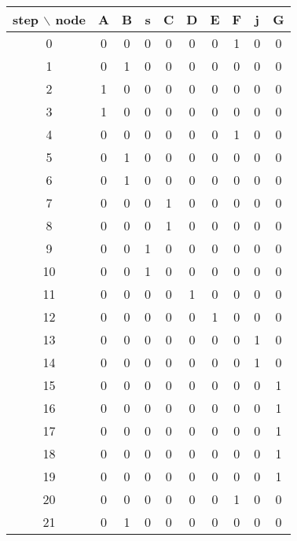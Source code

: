 \begin{table} \centering
\begin{tabular}{|c|c|c|c|c|c|c|c|c|c|}
\hline step $\backslash$ node & A & B & s & C & D & E & F & j & G \\
\hline 0                      & 0 & 0 & 0 & 0 & 0 & 0 & 1 & 0 & 0 \\
\hline 1                      & 0 & 1 & 0 & 0 & 0 & 0 & 0 & 0 & 0 \\
\hline 2                      & 1 & 0 & 0 & 0 & 0 & 0 & 0 & 0 & 0 \\
\hline 3                      & 1 & 0 & 0 & 0 & 0 & 0 & 0 & 0 & 0 \\
\hline 4                      & 0 & 0 & 0 & 0 & 0 & 0 & 1 & 0 & 0 \\
\hline 5                      & 0 & 1 & 0 & 0 & 0 & 0 & 0 & 0 & 0 \\
\hline 6                      & 0 & 1 & 0 & 0 & 0 & 0 & 0 & 0 & 0 \\
\hline 7                      & 0 & 0 & 0 & 1 & 0 & 0 & 0 & 0 & 0 \\
\hline 8                      & 0 & 0 & 0 & 1 & 0 & 0 & 0 & 0 & 0 \\
\hline 9                      & 0 & 0 & 1 & 0 & 0 & 0 & 0 & 0 & 0 \\
\hline 10                     & 0 & 0 & 1 & 0 & 0 & 0 & 0 & 0 & 0 \\
\hline 11                     & 0 & 0 & 0 & 0 & 1 & 0 & 0 & 0 & 0 \\
\hline 12                     & 0 & 0 & 0 & 0 & 0 & 1 & 0 & 0 & 0 \\
\hline 13                     & 0 & 0 & 0 & 0 & 0 & 0 & 0 & 1 & 0 \\
\hline 14                     & 0 & 0 & 0 & 0 & 0 & 0 & 0 & 1 & 0 \\
\hline 15                     & 0 & 0 & 0 & 0 & 0 & 0 & 0 & 0 & 1 \\
\hline 16                     & 0 & 0 & 0 & 0 & 0 & 0 & 0 & 0 & 1 \\
\hline 17                     & 0 & 0 & 0 & 0 & 0 & 0 & 0 & 0 & 1 \\
\hline 18                     & 0 & 0 & 0 & 0 & 0 & 0 & 0 & 0 & 1 \\
\hline 19                     & 0 & 0 & 0 & 0 & 0 & 0 & 0 & 0 & 1 \\
\hline 20                     & 0 & 0 & 0 & 0 & 0 & 0 & 1 & 0 & 0 \\
\hline 21                     & 0 & 1 & 0 & 0 & 0 & 0 & 0 & 0 & 0 \\

\end{tabular}
\end{table}

